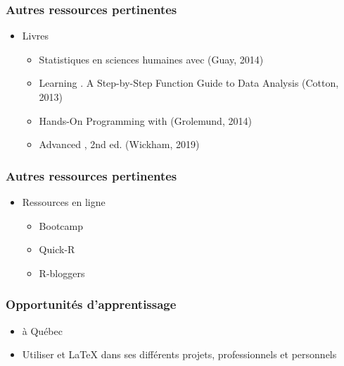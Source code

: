 \documentclass{beamer}
\begin{document}

    \begin{frame}
    
      \frametitle{Autres ressources pertinentes} \vspace{1cm}
      
       \begin{itemize}
        \item Livres
        
          \begin{itemize}
            \item Statistiques en sciences humaines avec \R (Guay, 2014)
            \item Learning \R. A Step-by-Step Function Guide to Data Analysis (Cotton, 2013)
            \item Hands-On Programming with \R (Grolemund, 2014)
            \item Advanced \R, 2nd ed. (Wickham, 2019)

        \end{itemize}
      \end{itemize}
      
     \end{frame}


    \begin{frame}
    
      \frametitle{Autres ressources pertinentes} \vspace{1cm}
      
       \begin{itemize}
       \item Ressources en ligne
       
        \begin{itemize}
          \item \R Bootcamp
          \item Quick-R
          \item R-bloggers
            
        \end{itemize}
      \end{itemize}
      
     \end{frame}
     


   \begin{frame}
    
      \frametitle{Opportunités d'apprentissage} \vspace{1cm}

        \begin{itemize}
          \item \R à Québec
          \item Utiliser \R et \LaTeX{} dans ses différents projets, professionnels et personnels
            
        \end{itemize}

     \end{frame}
\end{document}
